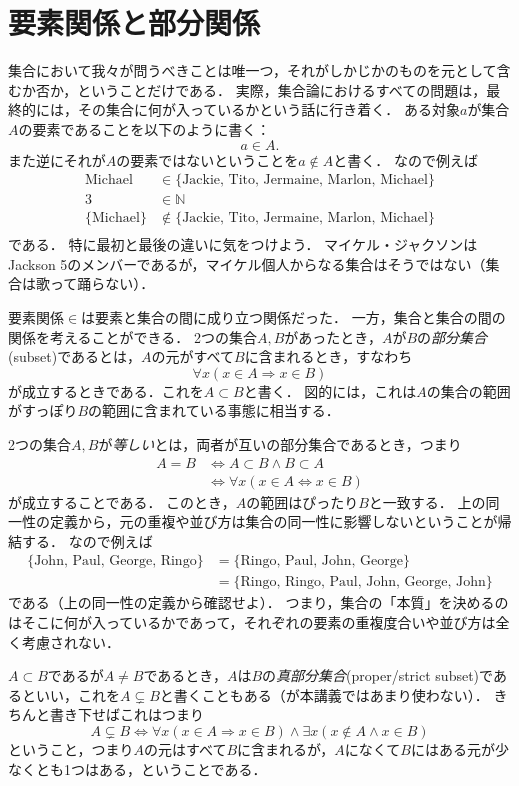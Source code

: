 \documentclass[11pt,a4paper]{jsarticle}
\begin{document}
\section{要素関係と部分関係}
集合において我々が問うべきことは唯一つ，それがしかじかのものを元として含むか否か，ということだけである．
実際，集合論におけるすべての問題は，最終的には，その集合に何が入っているかという話に行き着く．
ある対象$a$が集合$A$の要素であることを以下のように書く：
\[
 a \in A.
\]
また逆にそれが$A$の要素ではないということを$a \not \in A$と書く．
なので例えば
\begin{align*}
\text{Michael} &\in \{ \text{Jackie, Tito, Jermaine, Marlon, Michael}\}  \\
3 &\in \mathbb{N} \\
\{ \text{Michael} \} &\not\in \{ \text{Jackie, Tito, Jermaine, Marlon, Michael}\}  \\
\end{align*}
である．
特に最初と最後の違いに気をつけよう．
マイケル・ジャクソンはJackson 5のメンバーであるが，マイケル個人からなる集合はそうではない（集合は歌って踊らない）．

要素関係$\in$は要素と集合の間に成り立つ関係だった．
一方，集合と集合の間の関係を考えることができる．
2つの集合$A, B$があったとき，$A$が$B$の\emph{部分集合}(subset)であるとは，$A$の元がすべて$B$に含まれるとき，すなわち
\[
 \forall x (x \in A \Rightarrow x \in B)
\]
が成立するときである．これを$A \subset B$と書く．
図的には，これは$A$の集合の範囲がすっぽり$B$の範囲に含まれている事態に相当する．

2つの集合$A,B$が\emph{等しい}とは，両者が互いの部分集合であるとき，つまり
\begin{align*}
 A = B &\iff A \subset B \wedge B \subset A \\
&\iff \forall x (x \in A \iff x \in B)
\end{align*}
 が成立することである．
このとき，$A$の範囲はぴったり$B$と一致する．
上の同一性の定義から，元の重複や並び方は集合の同一性に影響しないということが帰結する．
なので例えば
\begin{align*}
 \{\text{John, Paul, George, Ringo}\} 
 &= \{\text{Ringo, Paul, John, George}\} \\
 &= \{\text{Ringo, Ringo, Paul, John, George, John}\}
\end{align*}
である（上の同一性の定義から確認せよ）．
つまり，集合の「本質」を決めるのはそこに何が入っているかであって，それぞれの要素の重複度合いや並び方は全く考慮されない．

$A \subset B$であるが$A \neq B$であるとき，$A$は$B$の\emph{真部分集合}(proper/strict subset)であるといい，これを$A \subsetneq B$と書くこともある（が本講義ではあまり使わない）．
きちんと書き下せばこれはつまり
\[
A \subsetneq B \iff \forall x (x \in A \Rightarrow x \in B) \wedge \exists x (x \not\in A \wedge x \in B)
\]
ということ，つまり$A$の元はすべて$B$に含まれるが，$A$になくて$B$にはある元が少なくとも1つはある，ということである．
\end{document}
